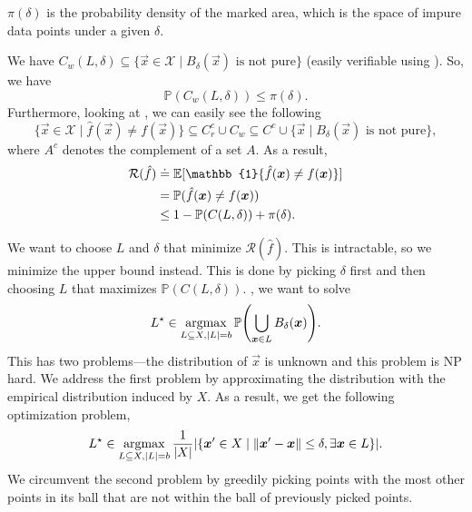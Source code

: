 \begin{marginfigure}
    \centering
    \caption{$\pi(\delta)$ is the probability density of the marked area, which is the space of impure data points under a given $\delta$.}
    \label{fig:batch-active-learning-pi}
\end{marginfigure}

We have $C_w(L, \delta) \subseteq \{ \vec{x} \in \mathcal{X} \mid \text{$B_{\delta}(\vec{x})$ is
        not pure} \}$ (easily verifiable using
). So, we have \[
    \mathbb{P}(C_w(L, \delta)) \leq \pi(\delta).
\]
Furthermore, looking at , we can easily see the following \[
    \{ \vec{x} \in \mathcal{X} \mid \hat{f}(\vec{x}) \neq f(\vec{x}) \} \subseteq C_r^c \cup C_w \subseteq C^c \cup \{ \vec{x} \mid \text{$B_{\delta}(\vec{x})$ is not pure} \},
\]
where $A^c$ denotes the complement of a set $A$. As a result,
\begin{align*}
    \mathcal{R}(\hat{f}) & \doteq \E[\mathbb{1}\{ \hat{f}(\vec{x}) \neq f(\vec{x}) \}] \\
                         & = \mathbb{P}( \hat{f}(\vec{x}) \neq f(\vec{x}))             \\
                         & \leq 1 - \mathbb{P}\lft( C(L, \delta) \rgt) + \pi(\delta).
\end{align*}

We want to choose $L$ and $\delta$ that minimize $\mathcal{R}(\hat{f})$. This is intractable, so we
minimize the upper bound instead. This is done by picking $\delta$ first and then choosing $L$ that
maximizes $\mathbb{P}(C(L, \delta))$. \Ie, we want to solve \[
    L^\star \in \argmax_{L \subseteq X, |L|=b} \mathbb{P}\lft( \bigcup_{\vec{x} \in L} B_{\delta}(\vec{x}) \rgt).
\]
This has two problems---the distribution of $\vec{x}$ is unknown and this problem is NP hard. We
address the first problem by approximating the distribution with the empirical distribution induced
by $X$. As a result, we get the following optimization problem, \[
    L^\star \in \argmax_{L \subseteq X, |L| = b} \frac{1}{|X|} \lft| \lft\{ \vec{x}' \in X \;\middle|\; \| \vec{x}' - \vec{x} \| \leq \delta, \exists \vec{x} \in L \rgt\} \rgt|.
\]
We circumvent the second problem by greedily picking points with the most other points in its ball
that are not within the ball of previously picked points.
